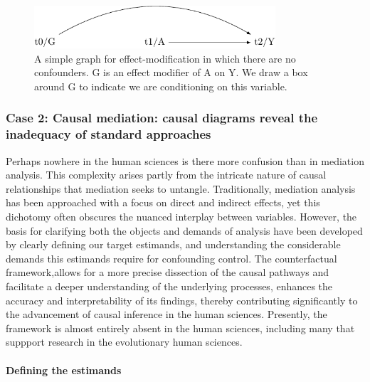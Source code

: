\documentclass[
  singlecolumn,
  9pt]{article}
\let\oldparagraph\paragraph
\renewcommand{\paragraph}[1]{\oldparagraph{#1}\mbox{}}
\begin{document}
\begin{figure}

{\centering \includegraphics[width=0.8\textwidth,height=\textheight]{causal-dags_files/figure-pdf/fig-dag-effect-modfication-1.pdf}

}

\caption{\label{fig-dag-effect-modfication}A simple graph for
effect-modification in which there are no confounders. G is an effect
modifier of A on Y. We draw a box around G to indicate we are
conditioning on this variable.}

\end{figure}

\subsubsection{Case 2: Causal mediation: causal diagrams reveal the
inadequacy of standard
approaches}\label{case-2-causal-mediation-causal-diagrams-reveal-the-inadequacy-of-standard-approaches}

Perhaps nowhere in the human sciences is there more confusion than in
mediation analysis. This complexity arises partly from the intricate
nature of causal relationships that mediation seeks to untangle.
Traditionally, mediation analysis has been approached with a focus on
direct and indirect effects, yet this dichotomy often obscures the
nuanced interplay between variables. However, the basis for clarifying
both the objects and demands of analysis have been developed by clearly
defining our target estimands, and understanding the considerable
demands this estimands require for confounding control. The
counterfactual framework,allows for a more precise dissection of the
causal pathways and facilitate a deeper understanding of the underlying
processes, enhances the accuracy and interpretability of its findings,
thereby contributing significantly to the advancement of causal
inference in the human sciences. Presently, the framework is almost
entirely absent in the human sciences, including many that suppport
research in the evolutionary human sciences.

\paragraph{Defining the estimands}\label{defining-the-estimands}
\end{document}
